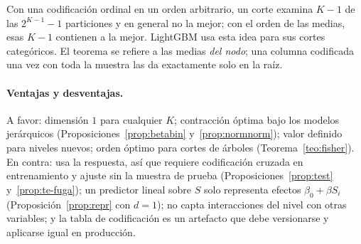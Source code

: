 \documentclass[11pt,a4paper]{article}
\theoremstyle{plain}
\theoremstyle{definition}
\theoremstyle{remark}
\newcommand{\1}{\mathbf{1}}
\begin{document}
Con una codificación ordinal en un orden arbitrario, un corte examina
$K-1$ de las $2^{K-1}-1$ particiones y en general no la mejor; con el
orden de las medias, esas $K-1$ contienen a la mejor. LightGBM usa esta
idea para sus cortes categóricos. El teorema se refiere a las medias
\emph{del nodo}; una columna codificada una vez con toda la muestra las
da exactamente solo en la raíz.

\paragraph{Ventajas y desventajas.} A favor: dimensión $1$ para cualquier
$K$; contracción óptima bajo los modelos jerárquicos
(Proposiciones~\ref{prop:betabin} y~\ref{prop:normnorm}); valor definido
para niveles nuevos; orden óptimo para cortes de árboles
(Teorema~\ref{teo:fisher}). En contra: usa la respuesta, así que requiere
codificación cruzada en entrenamiento y ajuste sin la muestra de prueba
(Proposiciones~\ref{prop:test} y~\ref{prop:te-fuga}); un predictor lineal
sobre $S$ solo representa efectos $\beta_0+\beta S_i$
(Proposición~\ref{prop:repr} con $d=1$); no capta interacciones del nivel
con otras variables; y la tabla de codificación es un artefacto que debe
versionarse y aplicarse igual en producción.
\end{document}
